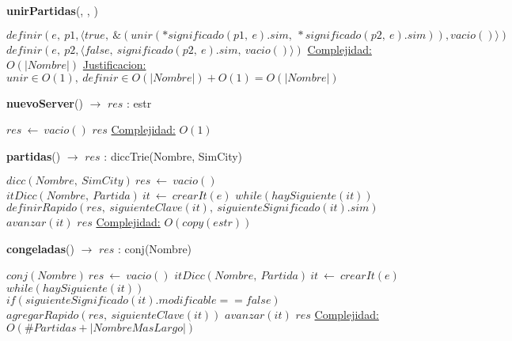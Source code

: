 \begin{Algoritmos}
    \begin{algorithm}[H]{\textbf{unirPartidas}(, , )}
        \begin{algorithmic}[1]
            \State $definir(e,\ p1, \langle true,\ \&(unir(*significado(p1,\ e).sim,\ *significado(p2,\ e).sim)), vacio()\rangle)$
            \State $definir(e,\ p2, \langle false,\ significado(p2,\ e).sim,\ vacio() \rangle)$
            \medskip
            \Statex \underline{Complejidad:} $O(|Nombre|)$
            \Statex \underline{Justificacion:} $unir \in O(1),\ definir \in O(|Nombre|) + O(1) = O(|Nombre|)$
        \end{algorithmic}
    \end{algorithm}    
    \begin{algorithm}[H]{\textbf{nuevoServer}() $\to$ $res$ : estr}
        \begin{algorithmic}[1]
            \State $res\ \gets\ vacio()$
            \Return $res$
            \medskip
            \Statex \underline{Complejidad:} $O(1)$
        \end{algorithmic}
    \end{algorithm}

    \begin{algorithm}[H]{\textbf{partidas}() $\to$ $res$ : diccTrie(Nombre, SimCity)}
        \begin{algorithmic}[1]
            \State $dicc(Nombre,\ SimCity)\ res\ \gets\ vacio()$
            \State $itDicc(Nombre,\ Partida)\ it\ \gets\ crearIt(e)$
            \State $while(haySiguiente(it))$
            \State \indent $definirRapido(res,\ siguienteClave(it),\ siguienteSignificado(it).sim)$
            \State \indent $avanzar(it)$ 
            \Return $res$
            \medskip
            \Statex \underline{Complejidad:} $O(copy(estr))$
        \end{algorithmic}
    \end{algorithm}

    \begin{algorithm}[H]{\textbf{congeladas}() $\to$ $res$ : conj(Nombre)}
        \begin{algorithmic}[1]
            \State $conj(Nombre)\ res\ \gets\ vacio()$
            \State $itDicc(Nombre,\ Partida)\ it\ \gets\ crearIt(e)$
            \State $while(haySiguiente(it))$
            \State \indent $if (siguienteSignificado(it).modificable == false)$
            \State \indent \indent $agregarRapido(res,\ siguienteClave(it))$
            \State \indent $avanzar(it)$ 
            \Return $res$
            \medskip
            \Statex \underline{Complejidad:} $O(\# Partidas + |NombreMasLargo|)$
        \end{algorithmic}
    \end{algorithm}


\end{Algoritmos}
